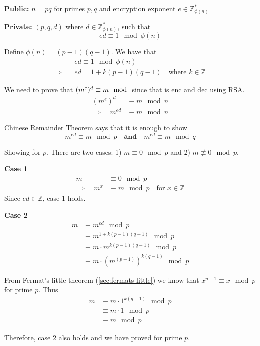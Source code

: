 
\textbf{Public:} $n = pq$ for primes $p, q$ and encryption exponent $e
\in \mathbb{Z}_{\phi(n)}^*$

\textbf{Private:} $(p, q, d)$ where $d \in \mathbb{Z}_{\phi(n)}^*$, such that
\[ ed \equiv 1 \mod \phi(n) \]

Define $\phi(n) = (p-1)(q-1)$. We have that
\begin{align*}
  & ed \equiv 1 \mod \phi(n)\\
  \Rightarrow\quad& ed = 1 + k(p - 1)(q - 1) \quad \text{where } k \in \mathbb{Z}
\end{align*}

We need to prove that $(m^e)^d \equiv m \mod$ since that is enc and dec using RSA.
\begin{align*}
(m^e)^d &\equiv m \mod n \\
\Rightarrow\quad m^{ed} &\equiv m \mod n
\end{align*}

Chinese Remainder Theorem says that it is enough to show
\[ m^{ed} \equiv m \mod p \quad \textbf{and} \quad m^{ed} \equiv m \mod q \]

Showing for $p$. There are two cases: 1) $m \equiv 0 \mod p$ and 2) $m \not\equiv 0 \mod p$.

\textbf{Case 1}
\begin{align*}
  m &\equiv 0 \mod p\\
  \Rightarrow\quad m^x &\equiv m \mod p \quad \text{for } x \in \mathbb{Z}
\end{align*}
Since $ed \in \mathbb{Z}$, case 1 holds.

\textbf{Case 2}
\begin{align*}
m &\equiv m^{ed} \mod p \\
  &\equiv m^{1 + k(p-1)(q-1)} \mod p \\
  &\equiv m \cdot m^{k(p-1)(q-1)} \mod p \\
  &\equiv m \cdot (m^{(p-1)})^{k(q-1)} \mod p
\end{align*}

From Fermat's little theorem (\ref{sec:fermats-little}) we know that
$x^{p-1} \equiv x \mod p$ for prime $p$. Thus
\begin{align*}
m &\equiv m \cdot 1^{k(q-1)} \mod p \\
  &\equiv m \cdot 1 \mod p \\
  &\equiv m \mod p
\end{align*}

Therefore, case 2 also holds and we have proved for prime $p$.
